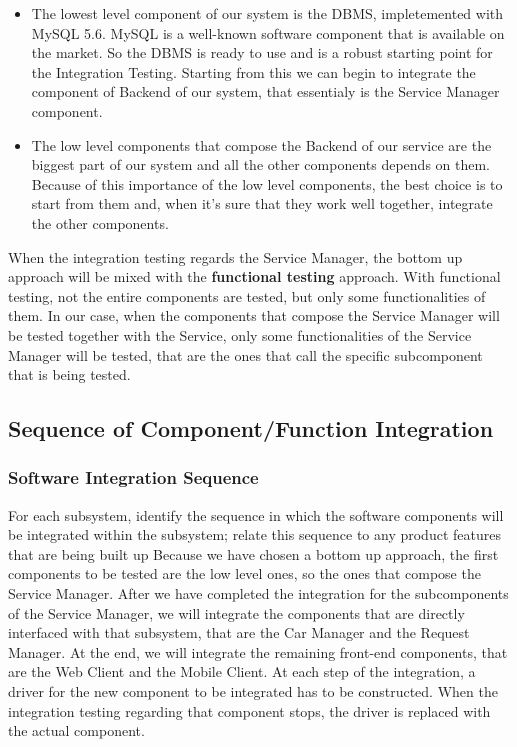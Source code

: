 \begin{itemize}
\item The lowest level component of our system is the DBMS, impletemented with MySQL 5.6. MySQL is a well-known software component that is available on the market. So the DBMS is ready to use and is a robust starting point for the Integration Testing. Starting from this we can begin to integrate the component of Backend of our system, that essentialy is the Service Manager component. 
\item The low level components that compose the Backend of our service are the biggest part of our system and all the other components depends on them. Because of this importance of the low level components, the best choice is to start from them and, when it's sure that they work well together, integrate the other components.
\end{itemize}  

When the integration testing regards the Service Manager, the bottom up approach will be mixed with the \textbf{functional testing} approach. With functional testing, not the entire components are tested, but only some functionalities of them. In our case, when the components that compose the Service Manager will be tested together with the Service, only some functionalities of the Service Manager will be tested, that are the ones that call the specific subcomponent that is being tested.
\subsection{Sequence of Component/Function Integration} 
\subsubsection{Software Integration Sequence} For each subsystem, identify the sequence in which the software components will be integrated within the subsystem; relate this sequence to any product features that are being built up
\newline
{}
Because we have chosen a bottom up approach, the first components to be tested are the low level ones, so the ones that compose the Service Manager. After we have completed the integration for the subcomponents of the Service Manager, we will integrate the components that are directly interfaced with that subsystem, that are the Car Manager and the Request Manager. At the end, we will integrate the remaining front-end components, that are the Web Client and the Mobile Client.
At each step of the integration, a driver for the new component to be integrated has to be constructed. When the integration testing regarding that component stops, the driver is replaced with the actual component.
